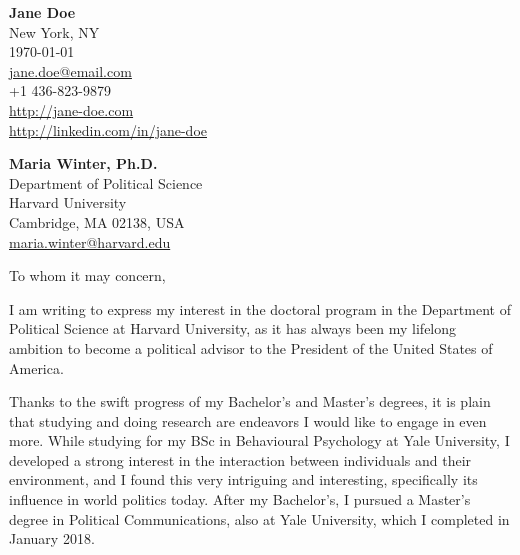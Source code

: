 \documentclass[11pt]{report}
\begin{document}
\begin{titlepage}


    \begin{minipage}[t]{0.95\textwidth}
        \hfill
        \raggedleft
        \textbf{ Jane Doe} \\
        New York, NY \\
        \today\\
        \href{mailto:jane.doe@email.com}{jane.doe@email.com} \\
        +1 436-823-9879 \\
        \url{http://jane-doe.com} \\
        \url{http://linkedin.com/in/jane-doe}
    \end{minipage}

\raggedright \textbf{Maria Winter, Ph.D.} \\ Department of Political Science \\ Harvard University \\ Cambridge, MA 02138, USA \\ \href{mailto:maria.winter@harvard.edu}{maria.winter@harvard.edu}\\

\vspace{0.7em}

\raggedright To whom it may concern,\\

\vspace{0.7em}

I am writing to express my interest in the doctoral program in the Department of Political Science at Harvard University, as it has always been my lifelong ambition to become a political advisor to the President of the United States of America.

\vspace{0.7em}

Thanks to the swift progress of my Bachelor's and Master's degrees, it is plain that studying and doing research are endeavors I would like to engage in even more. While studying for my BSc in Behavioural Psychology at Yale University, I developed a strong interest in the interaction between individuals and their environment, and I found this very intriguing and interesting, specifically its influence in world politics today. After my Bachelor's, I pursued a Master's degree in Political Communications, also at Yale University, which I completed in January 2018.


\end{titlepage}
\end{document}
